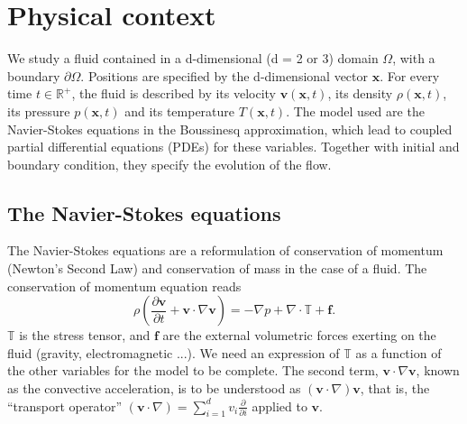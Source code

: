 \documentclass[12pt]{article}
\newcommand{\R}{\mathbb{R}}
\newcommand{\vb}[1]{\ensuremath{\boldsymbol #1}}
\begin{document}











\section{Physical context}
We study a fluid contained in a d-dimensional (d = 2 or 3) domain
$\Omega$, with a boundary $\partial \Omega$. Positions are specified
by the d-dimensional vector \vb{x}. For every time $t \in \R^+$, the
fluid is described by its velocity $\vb{v}(\vb{x}, t)$, its density
$\rho(\vb{x}, t)$, its pressure $p(\vb{x},t)$ and its temperature
$T(\vb{x}, t)$. The model used are the Navier-Stokes equations in the
Boussinesq approximation, which lead to coupled partial differential
equations (PDEs) for these variables. Together with initial and
boundary condition, they specify the evolution of the flow.
\subsection{The Navier-Stokes equations}
The Navier-Stokes equations are a reformulation of conservation of
momentum (Newton's Second Law) and conservation of mass in the case of
a fluid. The conservation of momentum equation reads
\begin{equation}
  \rho \left(\frac{\partial \vb{v}}{\partial t} + \vb{v} \cdot
    \nabla \vb{v}\right) = -\nabla p + \nabla \cdot\mathbb{T} +
  \vb{f}.
\end{equation}
$\mathbb{T}$ is the stress tensor, and \vb{f} are the external
volumetric forces exerting on the fluid (gravity, electromagnetic
...).  We need an expression of $\mathbb{T}$ as a function of the
other variables for the model to be complete. The second term, $\vb{v}
\cdot \nabla \vb{v}$, known as the convective acceleration, is to be
understood as $(\vb{v} \cdot \nabla) \vb{v}$, that is, the ``transport
operator'' $(\vb{v} \cdot \nabla) = \sum_{i=1}^d v_i
\frac{\partial}{\partial i}$ applied to $\vb{v}$.
\end{document}
